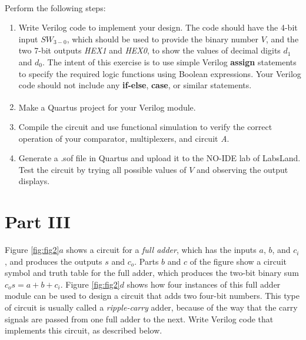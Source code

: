 \documentclass[epsfig,10pt,fullpage]{article}
\begin{document}
~\\
Perform the following steps:
\begin{enumerate}
\item Write Verilog code to implement your design. The code
should have the 4-bit input $SW_{3-0}$, which should be
used to provide the binary number $V$, and the two 7-bit outputs {\it HEX1} and {\it HEX0},
to show the values of decimal digits $d_1$ and $d_0$. 
The intent of this exercise is to use simple Verilog {\bf assign}
statements to specify the required logic functions using Boolean
expressions. Your Verilog code should not include any {\bf if-else}, {\bf case}, or
similar statements. 
\item Make a Quartus\textsuperscript{\textregistered} project for your Verilog module.
\item Compile the circuit and use functional simulation to verify the correct operation of
your comparator, multiplexers, and circuit {\it A}.
\item Generate a .sof file in Quartus and upload it to the NO-IDE lab of LabsLand. Test the circuit by trying all possible 
values of $V$ and observing the output displays.
\end{enumerate}

\section*{Part III}
Figure \ref{fig:fig2}$a$ shows a circuit for a {\it full adder}, 
which has the inputs $a$, $b$, and $c_i$,
and produces the outputs $s$ and $c_o$. Parts $b$ and $c$ of the figure show a circuit
symbol and truth table for the full adder, which produces the two-bit binary sum
$c_o s = a + b + c_i$. Figure \ref{fig:fig2}$d$ shows how four instances of this full adder module
can be used to design a circuit that adds two four-bit numbers. This type of circuit is
usually called a {\it ripple-carry} adder, because of the way that the carry signals are 
passed from one full adder to the next. Write Verilog code that implements this circuit,
as described below.
\end{document}
